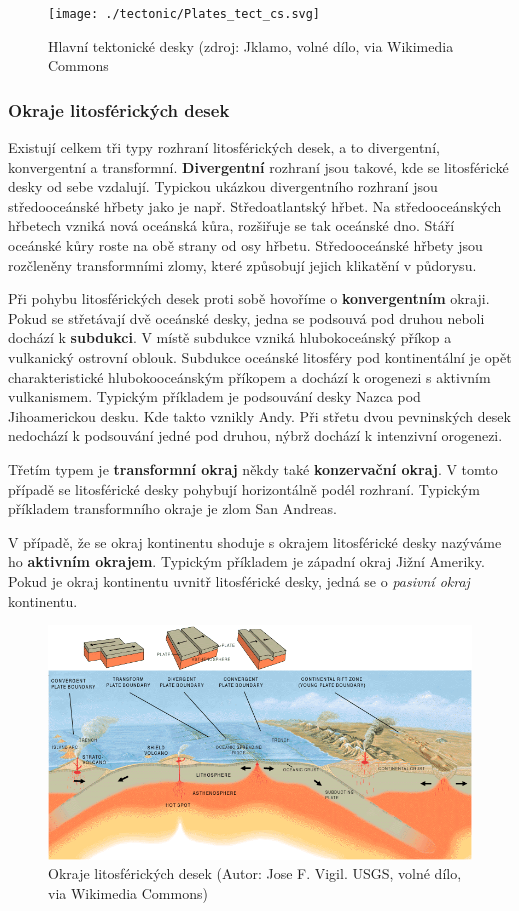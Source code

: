 \begin{figure}[h]
	\texttt{[image: ./tectonic/Plates\_tect\_cs.svg]}
	\caption{Hlavní tektonické desky (zdroj: Jklamo, volné dílo, via Wikimedia Commons}
\end{figure}

\subsubsection{Okraje litosférických desek}
Existují celkem tři typy rozhraní litosférických desek, a to divergentní, konvergentní a transformní. \textbf{Divergentní} rozhraní jsou takové, kde se litosférické desky od sebe vzdalují. Typickou ukázkou divergentního rozhraní jsou středooceánské hřbety jako je např. Středoatlantský hřbet. Na středooceánských hřbetech vzniká nová oceánská kůra, rozšiřuje se tak oceánské dno. Stáří oceánské kůry roste na obě strany od osy hřbetu. Středooceánské hřbety jsou rozčleněny transformními zlomy, které způsobují jejich klikatění v půdorysu. 

Při pohybu litosférických desek proti sobě hovoříme o \textbf{konvergentním} okraji. Pokud se střetávají dvě oceánské desky, jedna se podsouvá pod druhou neboli dochází k \textbf{subdukci}. V místě subdukce vzniká hlubokoceánský příkop a vulkanický ostrovní oblouk.  Subdukce oceánské litosféry pod kontinentální je opět charakteristické hlubokooceánským příkopem a dochází k orogenezi s aktivním vulkanismem. Typickým příkladem je podsouvání desky Nazca pod Jihoamerickou desku. Kde takto vznikly Andy. Při střetu dvou pevninských desek nedochází k podsouvání jedné pod druhou, nýbrž dochází k intenzivní orogenezi. 

Třetím typem je \textbf{transformní okraj} někdy také \textbf{konzervační okraj}. V tomto případě se litosférické desky pohybují horizontálně podél rozhraní. Typickým příkladem transformního okraje je zlom San Andreas.

V případě, že se okraj kontinentu shoduje s okrajem litosférické desky nazýváme ho \textbf{aktivním okrajem}. Typickým příkladem je západní okraj Jižní Ameriky. Pokud je okraj kontinentu uvnitř litosférické desky, jedná se o \emph{pasivní okraj} kontinentu. 
\begin{figure}[h]
	\centering
	\includegraphics[width=1\linewidth]{obrazky/tectonic/Tectonic_plate_boundaries}
	\caption{Okraje litosférických desek (Autor: Jose F. Vigil. USGS, volné dílo, via Wikimedia Commons)}
	\label{fig:tectonicplateboundaries}
\end{figure}


